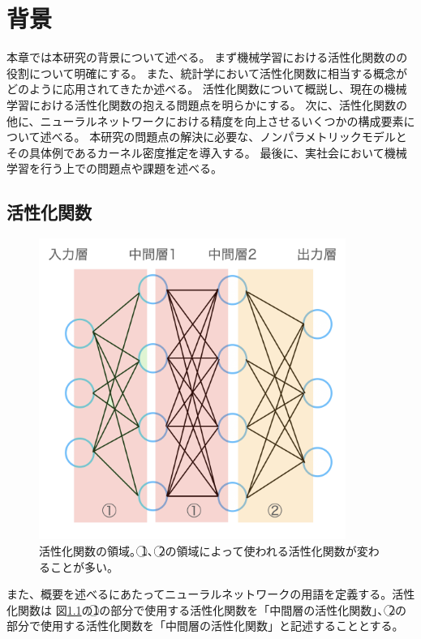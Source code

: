 \chapter{背景}
\label{background}

本章では本研究の背景について述べる。
まず機械学習における活性化関数のの役割について明確にする。
また、統計学において活性化関数に相当する概念がどのように応用されてきたか述べる。
活性化関数について概説し、現在の機械学習における活性化関数の抱える問題点を明らかにする。
次に、活性化関数の他に、ニューラルネットワークにおける精度を向上させるいくつかの構成要素について述べる。
本研究の問題点の解決に必要な、ノンパラメトリックモデルとその具体例であるカーネル密度推定を導入する。
最後に、実社会において機械学習を行う上での問題点や課題を述べる。



\section{活性化関数}

\begin{figure}[hbtp]
    \begin{center}
        \includegraphics[width=10cm]{asset/neural_network2.png}
            \caption{活性化関数の領域。\textcircled{\scriptsize 1}、\textcircled{\scriptsize 2}の領域によって使われる活性化関数が変わることが多い。}
            \label{neural_network1}
    \end{center}
\end{figure}

また、概要を述べるにあたってニューラルネットワークの用語を定義する。活性化関数は
図\ref{neural_network1}の\textcircled{\scriptsize 1}の部分で使用する活性化関数を「中間層の活性化関数」、\textcircled{\scriptsize 2}の部分で使用する活性化関数を「中間層の活性化関数」と記述することとする。

